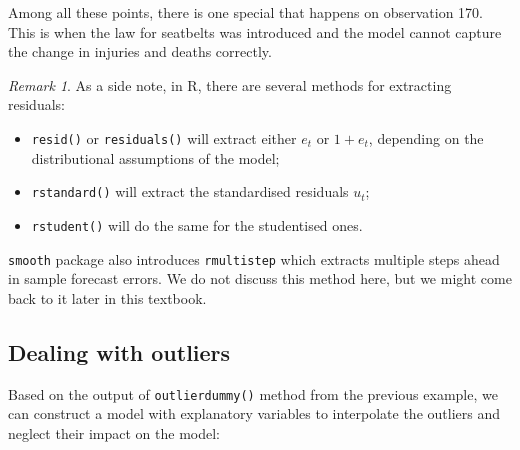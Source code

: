 \documentclass[
]{book}
\newenvironment{Shaded}{\begin{snugshade}}{\end{snugshade}}
\newcommand{\AttributeTok}[1]{\textcolor[rgb]{0.77,0.63,0.00}{#1}}
\newcommand{\DecValTok}[1]{\textcolor[rgb]{0.00,0.00,0.81}{#1}}
\newcommand{\FunctionTok}[1]{\textcolor[rgb]{0.00,0.00,0.00}{#1}}
\newcommand{\NormalTok}[1]{#1}
\newcommand{\OtherTok}[1]{\textcolor[rgb]{0.56,0.35,0.01}{#1}}
\newcommand{\SpecialCharTok}[1]{\textcolor[rgb]{0.00,0.00,0.00}{#1}}
\newcommand{\StringTok}[1]{\textcolor[rgb]{0.31,0.60,0.02}{#1}}
\providecommand{\tightlist}{%
  \setlength{\itemsep}{0pt}\setlength{\parskip}{0pt}}
\theoremstyle{definition}
\theoremstyle{definition}
\theoremstyle{definition}
\theoremstyle{definition}
\theoremstyle{remark}
\newtheorem*{remark}{Remark}
\begin{document}
Among all these points, there is one special that happens on observation 170. This is when the law for seatbelts was introduced and the model cannot capture the change in injuries and deaths correctly.

\begin{remark}
As a side note, in R, there are several methods for extracting residuals:

\begin{itemize}
\tightlist
\item
  \texttt{resid()} or \texttt{residuals()} will extract either \(e_t\) or \(1+e_t\), depending on the distributional assumptions of the model;
\item
  \texttt{rstandard()} will extract the standardised residuals \(u_t\);
\item
  \texttt{rstudent()} will do the same for the studentised ones.
\end{itemize}

\texttt{smooth} package also introduces \texttt{rmultistep} which extracts multiple steps ahead in sample forecast errors. We do not discuss this method here, but we might come back to it later in this textbook.
\end{remark}

\hypertarget{dealing-with-outliers}{%
\subsection{Dealing with outliers}\label{dealing-with-outliers}}

Based on the output of \texttt{outlierdummy()} method from the previous example, we can construct a model with explanatory variables to interpolate the outliers and neglect their impact on the model:

\begin{Shaded}
\end{Shaded}
\end{document}
